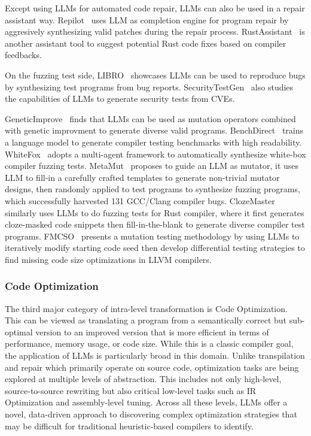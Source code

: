 \documentclass[pdflatex,sn-mathphys-ay,twocolumn, a4paper]{sn-jnl}%
\theoremstyle{thmstyleone}%
\theoremstyle{thmstyletwo}%
\theoremstyle{thmstylethree}%
\begin{document}
Except using LLMs for automated code repair, LLMs can also be used in a repair assistant way.
Repilot~\citep{131_wei2023_fse} uses LLM as completion engine for program repair by aggresively synthesizing valid patches during the repair process.
RustAssistant~\citep{113_deligiannis2024rustassistant} is another assistant tool to suggest potential Rust code fixes based on compiler feedbacks.


On the fuzzing test side, 
LIBRO~\citep{150_kang2023large} showcases LLMs can be used to reproduce bugs by synthesizing test programs from bug reports. 
SecurityTestGen~\citep{144_zhang2023doesllmgeneratesecurity} also studies the capabilities of LLMs to generate security tests from CVEs.

GeneticImprove~\citep{147_brownlee2023enhancing} finds that LLMs can be used as mutation operators combined with genetic improvment to generate diverse valid programs. 
BenchDirect~\citep{139_tsimpourlas2023benchdirectdirectedlanguagemodel} trains a language model to generate compiler testing benchmarks with high readability. 
WhiteFox~\citep{31_yang2024whitefox} adopts a multi-agent framework to automatically synthesize white-box compiler fuzzing tests.
MetaMut~\citep{76_ou2024mutators_asplos} proposes to guide an LLM as mutator, it uses LLM to fill-in a carefully crafted templates to generate non-trivial mutator designs, then randomly applied to test programs to synthesize fuzzing programs, which successfully harvested 131 GCC/Clang compiler bugs.
ClozeMaster~\citep{53_gao2025clozemaster} similarly uses LLMs to do fuzzing tests for Rust compiler, where it first generates cloze-masked code snippets then fill-in-the-blank to generate diverse compiler test programs.
FMCSO~\citep{14_italiano2025finding} presents a mutation testing methodology by using LLMs to iteratively modify starting code seed then develop differential testing strategies to find missing code size optimizations in LLVM compilers.

\subsubsection{Code Optimization}

The third major category of intra-level transformation is Code Optimization. This can be viewed as translating a program from a semantically correct but sub-optimal version to an improved version that is more efficient in terms of performance, memory usage, or code size. While this is a classic compiler goal, the application of LLMs is particularly broad in this domain. Unlike transpilation and repair which primarily operate on source code, optimization tasks are being explored at multiple levels of abstraction. This includes not only high-level, source-to-source rewriting but also critical low-level tasks such as IR Optimization and assembly-level tuning. Across all these levels, LLMs offer a novel, data-driven approach to discovering complex optimization strategies that may be difficult for traditional heuristic-based compilers to identify.
\end{document}
